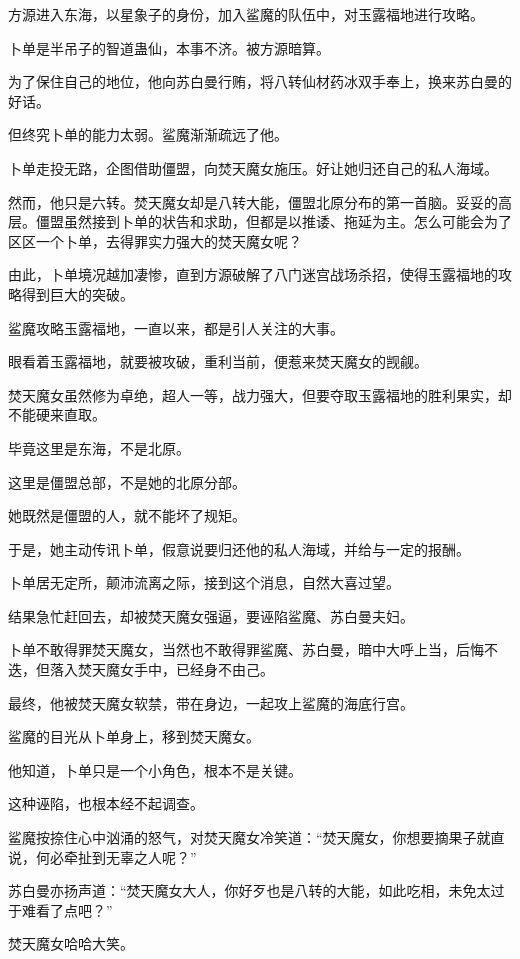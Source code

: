 \begin{this_body}
方源进入东海，以星象子的身份，加入鲨魔的队伍中，对玉露福地进行攻略。

卜单是半吊子的智道蛊仙，本事不济。被方源暗算。

为了保住自己的地位，他向苏白曼行贿，将八转仙材药冰双手奉上，换来苏白曼的好话。

但终究卜单的能力太弱。鲨魔渐渐疏远了他。

卜单走投无路，企图借助僵盟，向焚天魔女施压。好让她归还自己的私人海域。

然而，他只是六转。焚天魔女却是八转大能，僵盟北原分布的第一首脑。妥妥的高层。僵盟虽然接到卜单的状告和求助，但都是以推诿、拖延为主。怎么可能会为了区区一个卜单，去得罪实力强大的焚天魔女呢？

由此，卜单境况越加凄惨，直到方源破解了八门迷宫战场杀招，使得玉露福地的攻略得到巨大的突破。

鲨魔攻略玉露福地，一直以来，都是引人关注的大事。

眼看着玉露福地，就要被攻破，重利当前，便惹来焚天魔女的觊觎。

焚天魔女虽然修为卓绝，超人一等，战力强大，但要夺取玉露福地的胜利果实，却不能硬来直取。

毕竟这里是东海，不是北原。

这里是僵盟总部，不是她的北原分部。

她既然是僵盟的人，就不能坏了规矩。

于是，她主动传讯卜单，假意说要归还他的私人海域，并给与一定的报酬。

卜单居无定所，颠沛流离之际，接到这个消息，自然大喜过望。

结果急忙赶回去，却被焚天魔女强逼，要诬陷鲨魔、苏白曼夫妇。

卜单不敢得罪焚天魔女，当然也不敢得罪鲨魔、苏白曼，暗中大呼上当，后悔不迭，但落入焚天魔女手中，已经身不由己。

最终，他被焚天魔女软禁，带在身边，一起攻上鲨魔的海底行宫。

鲨魔的目光从卜单身上，移到焚天魔女。

他知道，卜单只是一个小角色，根本不是关键。

这种诬陷，也根本经不起调查。

鲨魔按捺住心中汹涌的怒气，对焚天魔女冷笑道：“焚天魔女，你想要摘果子就直说，何必牵扯到无辜之人呢？”

苏白曼亦扬声道：“焚天魔女大人，你好歹也是八转的大能，如此吃相，未免太过于难看了点吧？”

焚天魔女哈哈大笑。


\end{this_body}
